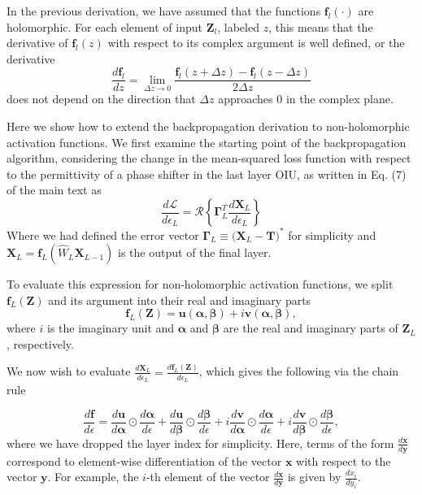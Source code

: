 
In the previous derivation, we have assumed that the functions $\mathbf{f}_l(\cdot)$ are holomorphic.  For each element of input $\mathbf{Z}_l$, labeled $z$, this means that the derivative of $\mathbf{f}_l(z)$ with respect to its complex argument is well defined, or the derivative 
\begin{equation}
\frac{d\mathbf{f}_l}{dz} = \lim_{\Delta z \to 0} \frac{\mathbf{f}_l(z+\Delta z) - \mathbf{f}_l(z-\Delta z)}{2 \Delta z}
\end{equation}
does not depend on the direction that $\Delta z$ approaches $0$ in the complex plane.  

Here we show how to extend the backpropagation derivation to non-holomorphic activation functions.  We first examine the starting point of the backpropagation algorithm, considering the change in the mean-squared loss function with respect to the permittivity of a phase shifter in the last layer OIU, as written in Eq. (7) of the main text as 
\begin{equation}
\frac{d\mathcal{L}}{d\epsilon_L} = \mathcal{R}\left\{\boldsymbol{\Gamma}_L^T \frac{d\mathbf{X}_L}{d\epsilon_L} \right\}
\label{eq:beginning}
\end{equation}
Where we had defined the error vector $\boldsymbol{\Gamma}_L \equiv \big(\mathbf{X}_L - \mathbf{T} \big)^*$ for simplicity and $\mathbf{X}_L = \mathbf{f}_L(\hat{W}_L \mathbf{X}_{L-1})$ is the output of the final layer.

To evaluate this expression for non-holomorphic activation functions, we split $\mathbf{f}_L(\mathbf{Z})$ and its argument into their real and imaginary parts
\begin{equation}
\mathbf{f}_L(\mathbf{Z}) = \mathbf{u}(\boldsymbol{\alpha}, \boldsymbol{\beta}) + i \mathbf{v}(\boldsymbol{\alpha}, \boldsymbol{\beta}),
\end{equation}
where $i$ is the imaginary unit and $\boldsymbol{\alpha}$ and $\boldsymbol{\beta}$ are the real and imaginary parts of $\mathbf{Z}_L$, respectively.

We now wish to evaluate $\frac{d\mathbf{X}_L}{d\epsilon_L} = \frac{d\mathbf{f}_L(\mathbf{Z})}{d\epsilon_L}$, which gives the following via the chain rule

\begin{equation}
\frac{d\mathbf{f}}{d\epsilon} = \frac{d\mathbf{u}}{d\boldsymbol{\alpha}} \odot \frac{d\boldsymbol{\alpha}}{d\epsilon} + \frac{d\mathbf{u}}{d\boldsymbol{\beta}} \odot \frac{d\boldsymbol{\beta}}{d\epsilon} + i\frac{d\mathbf{v}}{d\boldsymbol{\alpha}} \odot \frac{d\boldsymbol{\alpha}}{d\epsilon} + i\frac{d\mathbf{v}}{d\boldsymbol{\beta}} \odot \frac{d\boldsymbol{\beta}}{d\epsilon},
\end{equation}
where we have dropped the layer index for simplicity.  Here, terms of the form $\frac{d\mathbf{x}}{d\mathbf{y}}$ correspond to element-wise differentiation of the vector $\mathbf{x}$ with respect to the vector $\mathbf{y}$.  For example, the $i$-th element of the vector $\frac{d\mathbf{x}}{d\mathbf{y}}$ is given by $\frac{dx_i}{dy_i}$.

